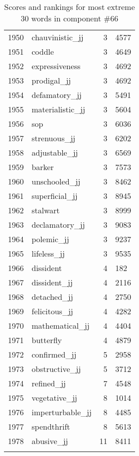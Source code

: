 \begin{longtable}[!htbp]{| rlr@{.}l |}
    1950 & chauvinistic\_jj & 3 & 4577 \\
    1951 & coddle & 3 & 4649 \\
    1952 & expressiveness & 3 & 4692 \\
    1953 & prodigal\_jj & 3 & 4692 \\
    1954 & defamatory\_jj & 3 & 5491 \\
    1955 & materialistic\_jj & 3 & 5604 \\
    1956 & sop & 3 & 6036 \\
    1957 & strenuous\_jj & 3 & 6202 \\
    1958 & adjustable\_jj & 3 & 6569 \\
    1959 & barker & 3 & 7573 \\
    1960 & unschooled\_jj & 3 & 8462 \\
    1961 & superficial\_jj & 3 & 8945 \\
    1962 & stalwart & 3 & 8999 \\
    1963 & declamatory\_jj & 3 & 9083 \\
    1964 & polemic\_jj & 3 & 9237 \\
    1965 & lifeless\_jj & 3 & 9535 \\
    1966 & dissident & 4 & 182 \\
    1967 & dissident\_jj & 4 & 2116 \\
    1968 & detached\_jj & 4 & 2750 \\
    1969 & felicitous\_jj & 4 & 4282 \\
    1970 & mathematical\_jj & 4 & 4404 \\
    1971 & butterfly & 4 & 4879 \\
    1972 & confirmed\_jj & 5 & 2958 \\
    1973 & obstructive\_jj & 5 & 3712 \\
    1974 & refined\_jj & 7 & 4548 \\
    1975 & vegetative\_jj & 8 & 1014 \\
    1976 & imperturbable\_jj & 8 & 4485 \\
    1977 & spendthrift & 8 & 5613 \\
    1978 & abusive\_jj & 11 & 8411 \\
    \hline
    \caption{Scores and rankings for most extreme 30 words in component \#66} \\
\end{longtable}
